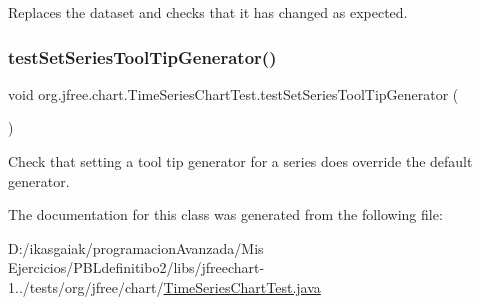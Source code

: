 Replaces the dataset and checks that it has changed as expected. \mbox{\label{classorg_1_1jfree_1_1chart_1_1_time_series_chart_test_ab331bff380903e83384851eac78ee918}} 
\subsubsection{\texorpdfstring{test\+Set\+Series\+Tool\+Tip\+Generator()}{testSetSeriesToolTipGenerator()}}
{\footnotesize\ttfamily void org.\+jfree.\+chart.\+Time\+Series\+Chart\+Test.\+test\+Set\+Series\+Tool\+Tip\+Generator (\begin{DoxyParamCaption}{ }\end{DoxyParamCaption})}

Check that setting a tool tip generator for a series does override the default generator. 

The documentation for this class was generated from the following file\+:\begin{DoxyCompactItemize}
\item 
D\+:/ikasgaiak/programacion\+Avanzada/\+Mis Ejercicios/\+P\+B\+Ldefinitibo2/libs/jfreechart-\/1../tests/org/jfree/chart/\mbox{\hyperlink{_time_series_chart_test_8java}{Time\+Series\+Chart\+Test.\+java}}\end{DoxyCompactItemize}
